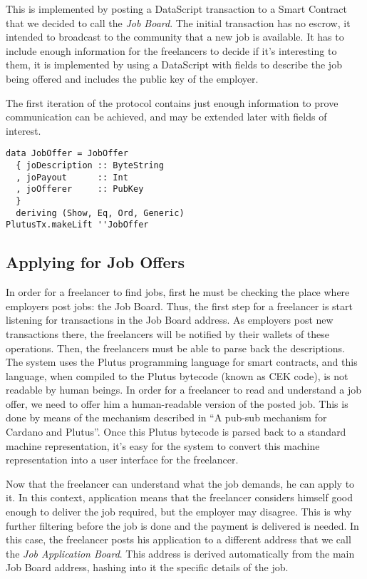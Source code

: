 \documentclass{article}
\begin{document}
This is implemented by posting a DataScript transaction to a Smart Contract that we decided to call the \emph{Job Board}. The initial transaction has no escrow, it intended to broadcast to the community that a new job is available. It has to include enough information for the freelancers to decide if it's interesting to them, it is implemented by using a DataScript with fields to describe the job being offered and includes the public key of the employer.

The first iteration of the protocol contains just enough information to prove communication can be achieved, and may be extended later with fields of interest.

\begin{samepage}
\begin{verbatim}
data JobOffer = JobOffer
  { joDescription :: ByteString
  , joPayout      :: Int
  , joOfferer     :: PubKey
  }
  deriving (Show, Eq, Ord, Generic)
PlutusTx.makeLift ''JobOffer
\end{verbatim}
\end{samepage}

\subsection{Applying for Job Offers}


In order for a freelancer to find jobs, first he must be checking the place where employers post jobs: the Job Board. Thus, the first step for a freelancer is start listening for transactions in the Job Board address. As employers post new transactions there, the freelancers will be notified by their wallets of these operations. Then, the freelancers must be able to parse back the descriptions. The system uses the Plutus programming language for smart contracts, and this language, when compiled to the Plutus bytecode (known as CEK code), is not readable by human beings. In order for a freelancer to read and understand a job offer, we need to offer him a human-readable version of the posted job. This is done by means of the mechanism described in ``A pub-sub mechanism for Cardano and Plutus''\cite{pub-sub-paper}. Once this Plutus bytecode is parsed back to a standard machine representation, it's easy for the system to convert this machine representation into a user interface for the freelancer.

Now that the freelancer can understand what the job demands, he can apply to it. In this context, application means that the freelancer considers himself good enough to deliver the job required, but the employer may disagree. This is why further filtering before the job is done and the payment is delivered is needed. In this case, the freelancer posts his application to a different address that we call the \emph{Job Application Board}. This address is derived automatically from the main Job Board address, hashing into it the specific details of the job.
\end{document}
